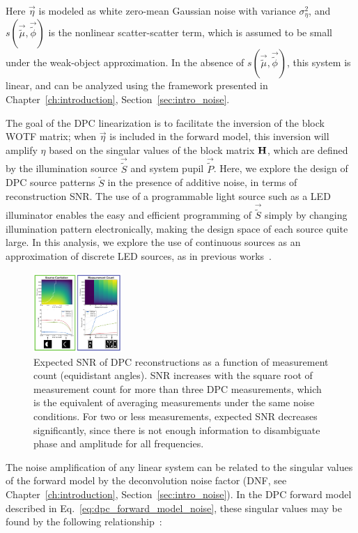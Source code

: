 \noindent Here $\vec{\eta}$ is modeled as white zero-mean Gaussian noise with variance $\sigma_{\eta}^2$, and $s(\vec{\tilde{\mu}}, \vec{\tilde{\phi}})$ is the nonlinear scatter-scatter term, which is assumed to be small under the weak-object approximation. In the absence of $s(\vec{\tilde{\mu}}, \vec{\tilde{\phi}})$, this system is linear, and can be analyzed using the framework presented in Chapter~\ref{ch:introduction}, Section~\ref{sec:intro_noise}. 


The goal of the DPC linearization is to facilitate the inversion of the block WOTF matrix; when $\vec{\eta}$ is included in the forward model, this inversion will amplify $\eta$ based on the singular values of the block matrix $\mathbf{H}$, which are defined by the illumination source $\vec{\tilde{S}}$ and system pupil $\vec{\tilde{P}}$. Here, we explore the design of DPC source patterns $\tilde{S}$ in the presence of additive noise, in terms of reconstruction SNR. The use of a programmable light source such as a LED illuminator enables the easy and efficient programming of $\vec{\tilde{S}}$ simply by changing illumination pattern electronically, making the design space of each source quite large. In this analysis, we explore the use of continuous sources as an approximation of discrete LED sources, as in previous works~\cite{tian2015quantitative, Phillips:17}.

\begin{figure}
  \label{fig:phase:dpc_measurement_count}
    \includegraphics[width=0.3\textwidth]{figures/fig_phase_dpc_optimization_meas.pdf}
  \caption{Expected SNR of DPC reconstructions as a function of measurement count (equidistant angles). SNR increases with the square root of measurement count for more than three DPC measurements, which is the equivalent of averaging measurements under the same noise conditions. For two or less measurements, expected SNR decreases significantly, since there is not enough information to disambiguate phase and amplitude for all frequencies.}
\end{figure}


The noise amplification of any linear system can be related to the singular values of the forward model by the deconvolution noise factor (DNF, see Chapter~\ref{ch:introduction}, Section~\ref{sec:intro_noise}). In the DPC forward model described in Eq.~\ref{eq:dpc_forward_model_noise}, these singular values may be found by the following relationship~\cite{silvester2000determinants}:

